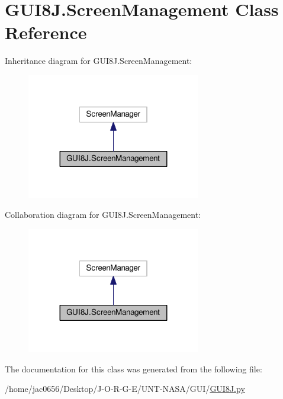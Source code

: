 \hypertarget{classGUI8J_1_1ScreenManagement}{}\section{G\+U\+I8\+J.\+Screen\+Management Class Reference}
\label{classGUI8J_1_1ScreenManagement}


Inheritance diagram for G\+U\+I8\+J.\+Screen\+Management\+:
\nopagebreak
\begin{figure}[H]
\begin{center}
\leavevmode
\includegraphics[width=215pt]{classGUI8J_1_1ScreenManagement__inherit__graph}
\end{center}
\end{figure}


Collaboration diagram for G\+U\+I8\+J.\+Screen\+Management\+:
\nopagebreak
\begin{figure}[H]
\begin{center}
\leavevmode
\includegraphics[width=215pt]{classGUI8J_1_1ScreenManagement__coll__graph}
\end{center}
\end{figure}


The documentation for this class was generated from the following file\+:\begin{DoxyCompactItemize}
\item 
/home/jac0656/\+Desktop/\+J-\/\+O-\/\+R-\/\+G-\/\+E/\+U\+N\+T-\/\+N\+A\+S\+A/\+G\+U\+I/\hyperlink{GUI8J_8py}{G\+U\+I8\+J.\+py}\end{DoxyCompactItemize}
